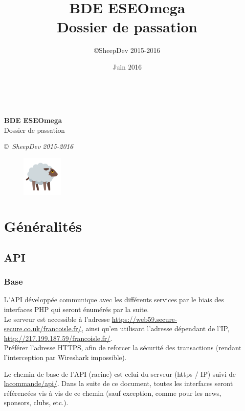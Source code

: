 \documentclass[12pt,a4paper,oneside]{report}
\author{\copyright SheepDev 2015-2016}
\title{BDE ESEOmega\\Dossier de passation}
\date{Juin 2016}
\begin{document}
\begin{center}

~

\vfill
\vfill
\huge{\textbf{BDE ESEOmega}\\Dossier de passation}

\Large{\copyright ~\textsl{SheepDev 2015-2016}}

\vfill

\end{center}

\begin{figure}[h!]\centering
\includegraphics[width=2cm]{res/sheep.png}
\label{fig:results}
\end{figure}

\vfill
\vfill
\vfill

\newpage

\chapter{Généralités}

\section{API}

\subsection{Base}

L'API développée communique avec les différents services par le biais des interfaces PHP qui seront énumérés par la suite.\\

\noindent Le serveur est accessible à l'adresse \url{https://web59.secure-secure.co.uk/francoisle.fr/}, ainsi qu'en utilisant l'adresse dépendant de l'IP, \url{http://217.199.187.59/francoisle.fr/}. \\

\noindent Préférer l'adresse HTTPS, afin de reforcer la sécurité des transactions (rendant l'interception par Wireshark impossible).

\noindent Le chemin de base de l'API (racine) est celui du serveur (https / IP) suivi de \url{lacommande/api/}. Dans la suite de ce document, toutes les interfaces seront référencées vis à vis de ce chemin (sauf exception, comme pour les news, sponsors, clubs, etc.).
\end{document}

